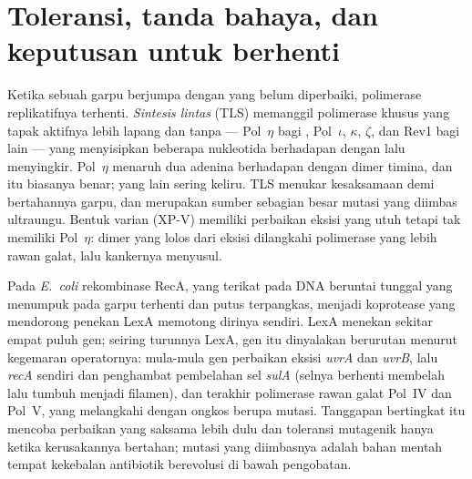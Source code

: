 \section{Toleransi, tanda bahaya, dan keputusan untuk berhenti}

\begin{definition}\label{def:b3:dna-repair:tls}
Ketika sebuah garpu berjumpa dengan  yang belum diperbaiki, polimerase
replikatifnya terhenti. \emph{Sintesis lintas } (TLS) memanggil
polimerase khusus yang tapak aktifnya lebih lapang dan tanpa  ---
Pol~$\eta$ bagi , Pol~$\iota$, $\kappa$, $\zeta$, dan Rev1
bagi  lain --- yang menyisipkan beberapa nukleotida berhadapan dengan
 lalu menyingkir. Pol~$\eta$ menaruh dua adenina berhadapan dengan
dimer timina, dan itu biasanya benar; yang lain sering keliru. TLS menukar
kesaksamaan demi bertahannya garpu, dan merupakan sumber sebagian besar
mutasi yang diimbas ultraungu. Bentuk varian  (XP-V)
memiliki perbaikan eksisi yang utuh tetapi tak memiliki Pol~$\eta$: dimer
yang lolos dari eksisi dilangkahi polimerase yang lebih rawan galat, lalu
kankernya menyusul.
\end{definition}

\begin{proposition}\label{prop:b3:dna-repair:sos}
Pada \emph{E.~coli} rekombinase RecA, yang terikat pada DNA beruntai tunggal
yang menumpuk pada garpu terhenti dan putus terpangkas, menjadi koprotease
yang mendorong penekan LexA memotong dirinya sendiri. LexA menekan sekitar
empat puluh gen; seiring turunnya LexA, gen itu dinyalakan berurutan menurut
kegemaran operatornya: mula-mula gen perbaikan eksisi \emph{uvrA} dan
\emph{uvrB}, lalu \emph{recA} sendiri dan penghambat pembelahan sel
\emph{sulA} (selnya berhenti membelah lalu tumbuh menjadi filamen), dan
terakhir polimerase rawan galat Pol~IV dan Pol~V, yang melangkahi  dengan
ongkos berupa mutasi. Tanggapan bertingkat itu mencoba perbaikan yang saksama
lebih dulu dan toleransi mutagenik hanya ketika kerusakannya bertahan; mutasi
yang diimbasnya adalah bahan mentah tempat kekebalan antibiotik berevolusi di
bawah pengobatan.
\end{proposition}


